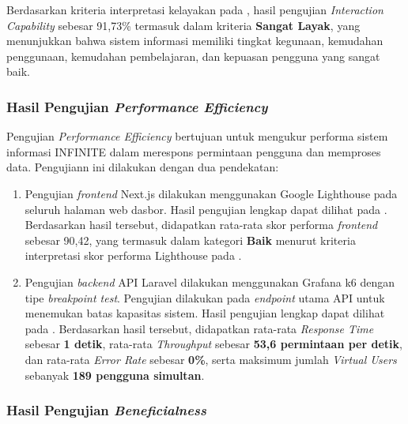 Berdasarkan kriteria interpretasi kelayakan pada , hasil pengujian \textit{Interaction Capability} sebesar 91{,}73\% termasuk dalam kriteria \textbf{Sangat Layak}, yang menunjukkan bahwa sistem informasi memiliki tingkat kegunaan, kemudahan penggunaan, kemudahan pembelajaran, dan kepuasan pengguna yang sangat baik.

\subsubsection{Hasil Pengujian \textit{Performance Efficiency}}

Pengujian \textit{Performance Efficiency} bertujuan untuk mengukur performa sistem informasi INFINITE dalam merespons permintaan pengguna dan memproses data. Pengujiann ini dilakukan dengan dua pendekatan:
\begin{enumerate}[label=\alph*.]
      \item Pengujian \textit{frontend} Next.js dilakukan menggunakan Google Lighthouse pada seluruh halaman web dasbor. Hasil pengujian lengkap dapat dilihat pada . Berdasarkan hasil tersebut, didapatkan rata-rata skor performa \textit{frontend} sebesar 90,42, yang termasuk dalam kategori \textbf{Baik} menurut kriteria interpretasi skor performa Lighthouse pada .
      \item Pengujian \textit{backend} API Laravel dilakukan menggunakan Grafana k6 dengan tipe \textit{breakpoint test}. Pengujian dilakukan pada \textit{endpoint} utama API untuk menemukan batas kapasitas sistem. Hasil pengujian lengkap dapat dilihat pada . Berdasarkan hasil tersebut, didapatkan rata-rata \textit{Response Time} sebesar \textbf{1 detik}, rata-rata \textit{Throughput} sebesar \textbf{53,6 permintaan per detik}, dan rata-rata \textit{Error Rate} sebesar \textbf{0\%}, serta maksimum jumlah \textit{Virtual Users} sebanyak \textbf{189 pengguna simultan}.
\end{enumerate}

\subsubsection{Hasil Pengujian \textit{Beneficialness}}

